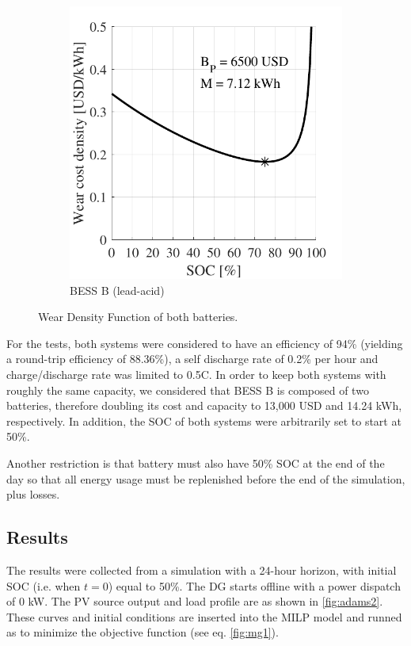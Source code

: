 \documentclass{ieeeaccess}
\begin{document}
\begin{figure}[!h]
\begin{subfigure}{.235\textwidth}
            \includegraphics[width=\linewidth]{figures/marginal_Rolls_8CH33P_lead-acid.pdf}
            \caption{\ac{BESS} B (lead-acid)}
            \label{fig:wn_curves1B}
        \end{subfigure}
        \caption{Wear Density Function of both batteries.}
        \label{fig:wn_curves1}
    \end{figure}

    For the tests, both systems were considered to have an efficiency of 94\% (yielding a round-trip efficiency of 88.36\%), a self discharge rate of 0.2\% per hour and charge/discharge rate was limited to 0.5C. In order to keep both systems with roughly the same capacity, we considered that \ac{BESS} B is composed of two batteries, therefore doubling its cost and capacity to 13,000 USD and 14.24 kWh, respectively. In addition, the \ac{SOC} of both systems were arbitrarily set to start at 50\%.

    Another restriction is that battery must also have 50\% \ac{SOC} at the end of the day so that all energy usage must be replenished before the end of the simulation, plus losses.

    \subsection{Results}
    The results were collected from a simulation with a 24-hour horizon, with initial \ac{SOC} (i.e. when $t=0$) equal to 50\%. The \ac{DG} starts offline with a power dispatch of 0 kW. The \ac{PV} source output and load profile are as shown in \ref{fig:adams2}. These curves and initial conditions are inserted into the \ac{MILP} model and runned as to minimize the objective function (see eq. \ref{fig:mg1}).
\end{document}
